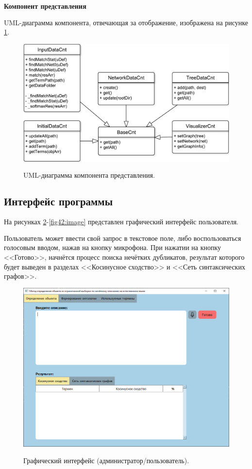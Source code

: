 \newpage

\textbf{Компонент представления}

UML-диаграмма компонента, отвечающая за отображение, изображена на рисунке \ref{fig51:image}.
\begin{figure}[h!]
	\begin{center}
		{\includegraphics[scale = 0.6]{img/uml/pdf/uml_cnt.pdf}}
		\caption{UML-диаграмма компонента представления.}
		\label{fig51:image}
	\end{center}
\end{figure}


\subsection{Интерфейс программы}
На рисунках \ref{fig40:image}-\ref{fig42:image} представлен графический интерфейс пользователя.

Пользователь может ввести свой запрос в текстовое поле, либо воспользоваться голосовым вводом, нажав на кнопку микрофона. При нажатии на кнопку <<Готово>>, начнётся процесс поиска нечётких дубликатов, результат которого будет выведен в разделах <<Косинусное сходство>> и <<Сеть синтаксических графов>>.
\begin{figure}[h]
	\begin{center}
		{\includegraphics[scale = 0.5]{img/ui/ui1.png}}
		\caption{Графический интерфейс (администратор/пользователь).}
		\label{fig40:image}
	\end{center}
\end{figure}

